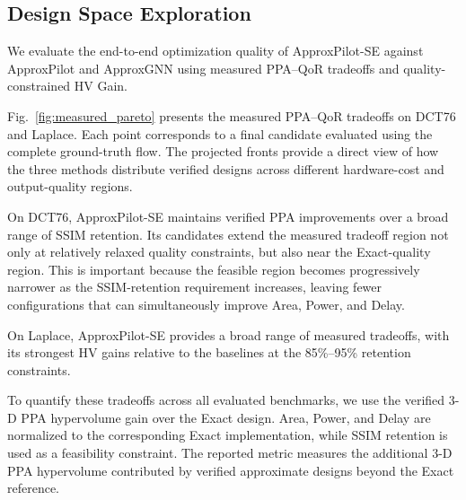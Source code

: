 \subsection{Design Space Exploration}
\label{sec:dse_results}

We evaluate the end-to-end optimization quality of
ApproxPilot-SE against ApproxPilot and ApproxGNN using
measured PPA--QoR tradeoffs and quality-constrained HV Gain.



Fig.~\ref{fig:measured_pareto} presents the measured PPA--QoR
tradeoffs on DCT76 and Laplace. Each point corresponds to a
final candidate evaluated using the complete ground-truth flow.
The projected fronts provide a direct view of how the three
methods distribute verified designs across different hardware-cost
and output-quality regions.

On DCT76, ApproxPilot-SE maintains verified PPA improvements
over a broad range of SSIM retention. Its candidates extend the
measured tradeoff region not only at relatively relaxed quality
constraints, but also near the Exact-quality region. This is
important because the feasible region becomes progressively
narrower as the SSIM-retention requirement increases, leaving
fewer configurations that can simultaneously improve Area,
Power, and Delay.

On Laplace, ApproxPilot-SE provides a broad range of measured
tradeoffs, with its strongest HV gains relative to the baselines
at the 85\%--95\% retention constraints.

To quantify these tradeoffs across all evaluated benchmarks,
we use the verified 3-D PPA hypervolume gain over the Exact
design. Area, Power, and Delay are normalized to the
corresponding Exact implementation, while SSIM retention is
used as a feasibility constraint. The reported metric measures
the additional 3-D PPA hypervolume contributed by verified
approximate designs beyond the Exact reference.

